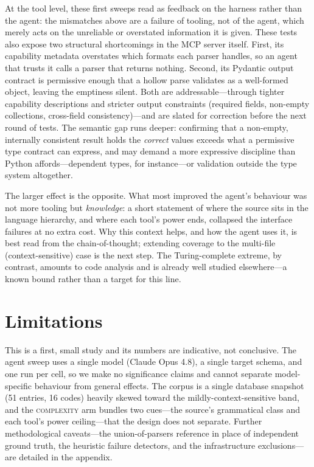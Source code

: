 \documentclass{article}
\begin{document}
At the tool level, these first sweeps read as feedback on the harness rather than the
agent: the mismatches above are a failure of tooling, not of the agent, which merely acts
on the unreliable or overstated information it is given. These tests also expose two
structural shortcomings in the MCP server itself. First, its capability metadata
overstates which formats each parser handles, so
an agent that trusts it calls a parser that returns nothing. Second, its Pydantic output
contract is permissive enough that a hollow parse validates as a well-formed object,
leaving the emptiness silent. Both are addressable---through tighter capability
descriptions and stricter output constraints (required fields, non-empty collections,
cross-field consistency)---and are slated for correction before the next round of
tests. The semantic gap runs
deeper: confirming that a non-empty, internally consistent result holds the \emph{correct}
values exceeds what a permissive type contract can express, and may demand a more
expressive discipline than Python affords---dependent types, for instance---or validation
outside the type system altogether.

The larger effect is the opposite. What most improved the agent's behaviour
was not more tooling but \emph{knowledge}: a short statement of where the source sits in
the language hierarchy, and where each tool's power ends, collapsed the interface failures
at no extra cost. Why this context helps, and how the agent uses it, is best read from the
chain-of-thought; extending coverage to the multi-file (context-sensitive) case is the
next step. The Turing-complete extreme, by contrast, amounts to code analysis
and is already well studied elsewhere---a known bound rather than a target for this line.

\section*{Limitations}

This is a first, small study and its numbers are indicative, not conclusive. The agent
sweep uses a single model (Claude Opus 4.8), a single target schema, and one run per
cell, so we make no significance claims and cannot separate model-specific behaviour from
general effects. The corpus is a single database snapshot (51 entries, 16 codes) heavily
skewed toward the mildly-context-sensitive band, and the \textsc{complexity} arm bundles
two cues---the source's grammatical class and each tool's power ceiling---that the design
does not separate. Further methodological caveats---the
union-of-parsers reference in place of independent ground truth, the heuristic failure
detectors, and the infrastructure exclusions---are detailed in the appendix.
\end{document}
